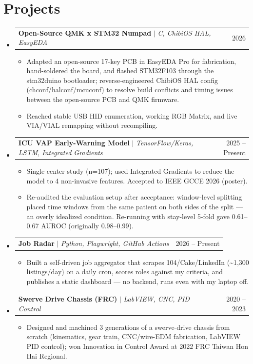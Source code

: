 \documentclass[letterpaper,11pt]{article}
\makeatletter
\newcommand{\resumeItem}[1]{
  \item\small{
    {#1 \vspace{-2pt}}
  }
}
\newcommand{\resumeProjectHeading}[2]{
    \item
    \begin{tabular*}{0.97\textwidth}{l@{\extracolsep{\fill}}r}
      \small#1 & #2 \\
    \end{tabular*}\vspace{-7pt}
}
\newcommand{\resumeSubHeadingListStart}{\begin{itemize}[leftmargin=0.0in, label={}]}
\newcommand{\resumeSubHeadingListEnd}{\end{itemize}}
\newcommand{\resumeItemListStart}{\begin{itemize}[leftmargin=*, itemsep=0pt, topsep=2pt]}
\newcommand{\resumeItemListEnd}{\end{itemize}\vspace{-5pt}}
\makeatother
\begin{document}
\section{Projects}
    \resumeSubHeadingListStart
      \resumeProjectHeading
          {\textbf{Open-Source QMK x STM32 Numpad} $|$ \emph{C, ChibiOS HAL, EasyEDA}}{2026}
          \resumeItemListStart
            \resumeItem{Adapted an open-source 17-key PCB in EasyEDA Pro for fabrication, hand-soldered the board, and flashed STM32F103 through the stm32duino bootloader; reverse-engineered ChibiOS HAL config (chconf/halconf/mcuconf) to resolve build conflicts and timing issues between the open-source PCB and QMK firmware.}
            \resumeItem{Reached stable USB HID enumeration, working RGB Matrix, and live VIA/VIAL remapping without recompiling.}
          \resumeItemListEnd
      \resumeProjectHeading
          {\textbf{ICU VAP Early-Warning Model} $|$ \emph{TensorFlow/Keras, LSTM, Integrated Gradients}}{2025 -- Present}
          \resumeItemListStart
            \resumeItem{Single-center study (n=107); used Integrated Gradients to reduce the model to 4 non-invasive features. Accepted to IEEE GCCE 2026 (poster).}
            \resumeItem{Re-audited the evaluation setup after acceptance: window-level splitting placed time windows from the same patient on both sides of the split --- an overly idealized condition. Re-running with stay-level 5-fold gave 0.61--0.67 AUROC (originally 0.98--0.99).}
          \resumeItemListEnd
      \resumeProjectHeading
          {\textbf{Job Radar} $|$ \emph{Python, Playwright, GitHub Actions}}{2026 -- Present}
          \resumeItemListStart
            \resumeItem{Built a self-driven job aggregator that scrapes 104/Cake/LinkedIn (\textasciitilde1,300 listings/day) on a daily cron, scores roles against my criteria, and publishes a static dashboard --- no backend, runs even with my laptop off.}
          \resumeItemListEnd
      \resumeProjectHeading
          {\textbf{Swerve Drive Chassis (FRC)} $|$ \emph{LabVIEW, CNC, PID Control}}{2020 -- 2023}
          \resumeItemListStart
            \resumeItem{Designed and machined 3 generations of a swerve-drive chassis from scratch (kinematics, gear train, CNC/wire-EDM fabrication, LabVIEW PID control); won Innovation in Control Award at 2022 FRC Taiwan Hon Hai Regional.}
          \resumeItemListEnd
    \resumeSubHeadingListEnd

\end{document}
